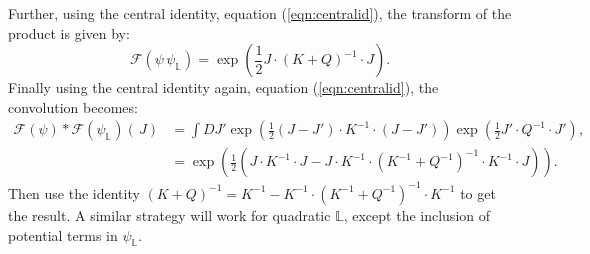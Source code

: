     Further, using the central identity, equation (\ref{eqn:centralid}), the transform of the product is given by:
    \[\mathcal{F}(\psi \, \psi_{\mathbb{L}}) = \exp\left( \frac{1}{2} J \cdot (K+Q)^{-1} \cdot J\right).\]
    Finally using the central identity again, equation (\ref{eqn:centralid}), the convolution becomes:
    \begin{align*}  \mathcal{F}(\psi) * \mathcal{F}(\psi_{\mathbb{L}}) (\, J) &=   \int D J' \exp \left( \frac{1}{2}(J-J') \cdot K^{-1} \cdot       (J-J')\right) \exp\left( \frac{1}{2} J' \cdot Q^{-1} \cdot J' \right),\\ 
    &=    \exp\left( \frac{1}{2} \left( J \cdot K^{-1} \cdot J -J \cdot K^{-1}\cdot(K^{-1} + Q^{-1})^{-1}\cdot K^{-1}\cdot J \right) \right).
    \end{align*}
    Then use the identity \( (K+Q)^{-1} = K^{-1} - K^{-1}\cdot(K^{-1} + Q^{-1})^{-1}\cdot K^{-1}\) to get the result. A similar strategy will work for quadratic \( \mathbb{L}\), except the inclusion of potential terms in \( \psi_{\mathbb{L}}\).
    